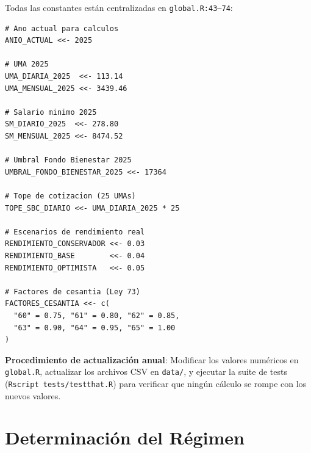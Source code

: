 \documentclass[11pt,a4paper]{report}
\begin{document}
\begin{tcolorbox}[colback=orange!5!white, colframe=orange!75!black, title=\textbf{Aplicaci\'on en C\'odigo}]
Todas las constantes est\'an centralizadas en \texttt{global.R:43--74}:

\begin{lstlisting}
# Ano actual para calculos
ANIO_ACTUAL <<- 2025

# UMA 2025
UMA_DIARIA_2025  <<- 113.14
UMA_MENSUAL_2025 <<- 3439.46

# Salario minimo 2025
SM_DIARIO_2025  <<- 278.80
SM_MENSUAL_2025 <<- 8474.52

# Umbral Fondo Bienestar 2025
UMBRAL_FONDO_BIENESTAR_2025 <<- 17364

# Tope de cotizacion (25 UMAs)
TOPE_SBC_DIARIO <<- UMA_DIARIA_2025 * 25

# Escenarios de rendimiento real
RENDIMIENTO_CONSERVADOR <<- 0.03
RENDIMIENTO_BASE        <<- 0.04
RENDIMIENTO_OPTIMISTA   <<- 0.05

# Factores de cesantia (Ley 73)
FACTORES_CESANTIA <<- c(
  "60" = 0.75, "61" = 0.80, "62" = 0.85,
  "63" = 0.90, "64" = 0.95, "65" = 1.00
)
\end{lstlisting}

\textbf{Procedimiento de actualizaci\'on anual}: Modificar los valores num\'ericos en \texttt{global.R}, actualizar los archivos CSV en \texttt{data/}, y ejecutar la suite de tests (\texttt{Rscript tests/testthat.R}) para verificar que ning\'un c\'alculo se rompe con los nuevos valores.
\end{tcolorbox}

\section{Determinaci\'on del R\'egimen}
\end{document}
